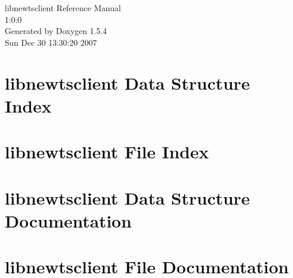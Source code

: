 \documentclass[a4paper]{book}
\begin{document}
\begin{titlepage}
\vspace*{7cm}
\begin{center}
{\Large libnewtsclient Reference Manual\\[1ex]\large 1:0:0 }\\
\vspace*{1cm}
{\large Generated by Doxygen 1.5.4}\\
\vspace*{0.5cm}
{\small Sun Dec 30 13:30:20 2007}\\
\end{center}
\end{titlepage}
\clearemptydoublepage
{}
\tableofcontents
\clearemptydoublepage
{}
\chapter{libnewtsclient Data Structure Index}

\chapter{libnewtsclient File Index}

\chapter{libnewtsclient Data Structure Documentation}






\chapter{libnewtsclient File Documentation}







\printindex
\end{document}
